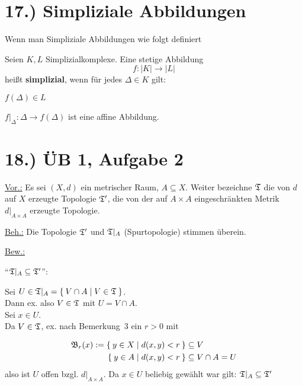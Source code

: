 \documentclass[a5paper,oneside]{scrbook}
\begin{document}

\section*{17.) Simpliziale Abbildungen}
Wenn man Simpliziale Abbildungen wie folgt definiert

\begin{definition}%
    Seien $K, L$ Simplizialkomplexe. Eine stetige Abbildung
    \[f:|K| \rightarrow |L|\]
    heißt \textbf{simplizial}, wenn für
    jedes $\Delta \in K$ gilt:
    \begin{defenum}
        \item $f(\Delta) \in L$
        \item $f|_{\Delta} : \Delta \rightarrow f(\Delta)$ ist eine
              affine Abbildung.
    \end{defenum}
\end{definition}


\section*{18.) ÜB 1, Aufgabe 2}
\underline{Vor.:} Es sei $(X, d)$ ein metrischer Raum, $A \subseteq X$. 
Weiter bezeichne $\mathfrak{T}$ die von $d$ auf $X$ erzeugte Topologie $\mathfrak{T}'$, die von
der auf $A \times A$ eingeschränkten Metrik $d|_{A \times A}$ erzeugte Topologie.

\underline{Beh.:} Die Topologie $\mathfrak{T}'$ und $\mathfrak{T}|_A$ (Spurtopologie) stimmen überein.

\underline{Bew.:}

\enquote{$\mathfrak{T}|_A \subseteq \mathfrak{T}'$}:

Sei $U \in \mathfrak{T}|_A = \Set{V \cap A | V \in \mathfrak{T}}$.\\
Dann ex. also $V \in \mathfrak{T}$ mit
$U = V \cap A$.\\
Sei $x \in U$.\\
Da $V \in \mathfrak{T}$, ex. nach Bemerkung~3 ein $r > 0$ mit 

\begin{align*}
    \mathfrak{B}_r(x) := \Set{y \in X | d(x,y) < r} &\subseteq V\\
                \Set{y \in A | d(x,y) < r} &\subseteq V \cap A = U
\end{align*}
also ist $U$ offen bzgl. $d|_{A \times A}$.
Da $x \in U$ beliebig gewählt war gilt: $\mathfrak{T}|_A \subseteq \mathfrak{T}'$
\end{document}

